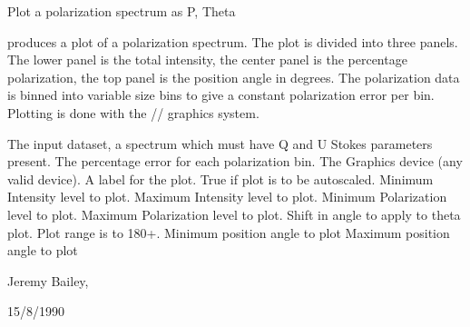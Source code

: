 \begin{manroutinedescription}
        Plot a polarization spectrum as P, Theta

        {} produces a plot of a polarization spectrum. The plot is
        divided into three panels. The lower panel is the total intensity,
        the center panel is the percentage polarization, the top panel
        is the position angle in degrees. The polarization data is binned
        into variable size bins to give a constant polarization error per
        bin. Plotting is done with the {}/{}/{} graphics system.

\begin{manparametertable}
  The input %
dataset, a spectrum which must
                               have Q and U Stokes parameters present.
     The percentage error for %
each polarization
                               bin.
   The Graphics device (any %
valid {} device).
     A label for the plot.
  True if plot is to be autoscaled.
     Minimum Intensity level to plot.
     Maximum Intensity level to plot.
     Minimum Polarization level to %
plot.
     Maximum Polarization level to %
plot.
     Shift in angle to apply to %
theta plot.
                               Plot range is {} to 180+{}.
     Minimum position angle to plot
     Maximum position angle to plot

\end{manparametertable}
         Jeremy Bailey, {}

         15/8/1990

\end{manroutinedescription}
